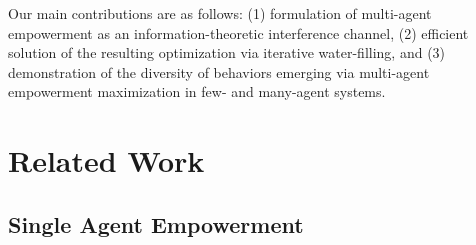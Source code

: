 \documentclass{article} %
\begin{document}
Our main contributions are as follows: (1) formulation of multi-agent empowerment as an information-theoretic interference channel, (2) efficient solution of the resulting optimization via iterative water-filling, and (3) demonstration of the diversity of behaviors emerging via multi-agent empowerment maximization in few- and many-agent systems.

\section{Related Work}

\subsection{Single Agent Empowerment}\label{sec:single-agent}
\end{document}
